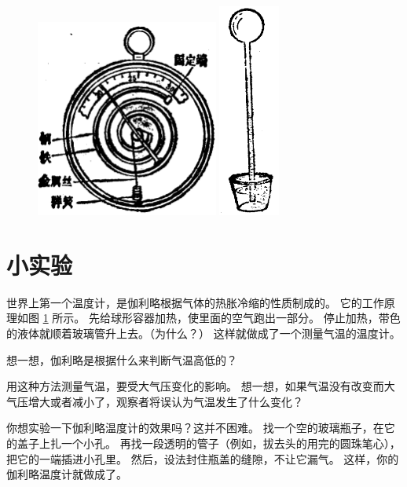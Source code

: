 \begin{figure}[htbp]
    \centering
    \begin{minipage}{8cm}
    \centering
    \includegraphics[width=6cm]{../pic/czwl2-ch2-11}
    \caption{}\label{fig:2-11}
    \end{minipage}
    \qquad
    \begin{minipage}{6cm}
    \centering
    \includegraphics[width=2cm]{../pic/czwl2-ch2-12}
    \caption{}\label{fig:2-12}
    \end{minipage}
\end{figure}

\section*{小实验}

世界上第一个温度计，是伽利略根据气体的热胀冷缩的性质制成的。
它的工作原理如图 \ref{fig:2-12} 所示。
先给球形容器加热，使里面的空气跑出一部分。
停止加热，带色的液体就顺着玻璃管升上去。（为什么？）
这样就做成了一个测量气温的温度计。

想一想，伽利略是根据什么来判断气温高低的？

用这种方法测量气温，要受大气压变化的影响。
想一想，如果气温没有改变而大气压增大或者减小了，观察者将误认为气温发生了什么变化？

你想实验一下伽利略温度计的效果吗？这并不困难。
找一个空的玻璃瓶子，在它的盖子上扎一个小孔。
再找一段透明的管子（例如，拔去头的用完的圆珠笔心），把它的一端插进小孔里。
然后，设法封住瓶盖的缝隙，不让它漏气。
这样，你的伽利略温度计就做成了。

